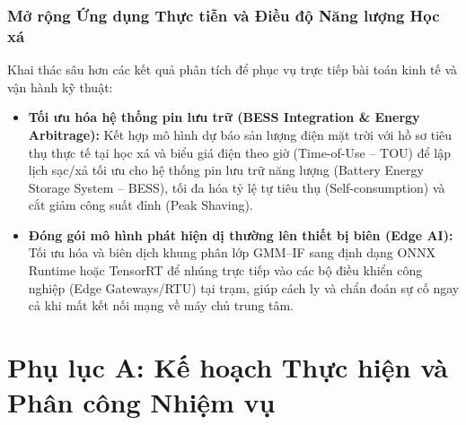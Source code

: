 \documentclass[12pt, a4paper]{report}
\begin{document}
\subsection{Mở rộng Ứng dụng Thực tiễn và Điều độ Năng lượng Học xá}
\label{subsec:future_applications}
Khai thác sâu hơn các kết quả phân tích để phục vụ trực tiếp bài toán kinh tế và vận hành kỹ thuật:
\begin{itemize}
    \item \textbf{Tối ưu hóa hệ thống pin lưu trữ (BESS Integration \& Energy Arbitrage):} Kết hợp mô hình dự báo sản lượng điện mặt trời với hồ sơ tiêu thụ thực tế tại học xá và biểu giá điện theo giờ (Time-of-Use -- TOU) để lập lịch sạc/xả tối ưu cho hệ thống pin lưu trữ năng lượng (Battery Energy Storage System -- BESS), tối đa hóa tỷ lệ tự tiêu thụ (Self-consumption) và cắt giảm công suất đỉnh (Peak Shaving).
    \item \textbf{Đóng gói mô hình phát hiện dị thường lên thiết bị biên (Edge AI):} Tối ưu hóa và biên dịch khung phân lớp GMM--IF sang định dạng ONNX Runtime hoặc TensorRT để nhúng trực tiếp vào các bộ điều khiển công nghiệp (Edge Gateways/RTU) tại trạm, giúp cách ly và chẩn đoán sự cố ngay cả khi mất kết nối mạng về máy chủ trung tâm.
\end{itemize}
\chapter*{Phụ lục A: Kế hoạch Thực hiện và Phân công Nhiệm vụ}
\label{app:kehoach}
\renewcommand{\thetable}{A.\arabic{table}}
\setcounter{table}{0}
\renewcommand{\thefigure}{A.\arabic{figure}}
\setcounter{figure}{0}
\end{document}
